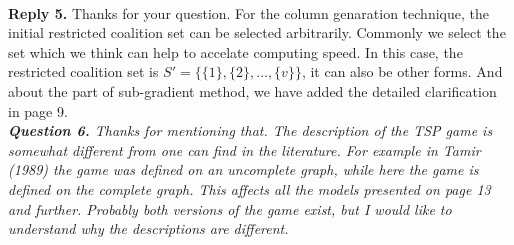 \documentclass[11pt]{article}
\begin{document}
\\[2mm]
\noindent \textbf{Reply 5.}
Thanks for your question. For the column genaration technique, the initial restricted coalition set can be selected arbitrarily. Commonly we select the set which we think can help to accelate computing speed. In this case, the restricted coalition set is
$S' = \{\{1\},\{2\},\ldots, \{v\}\}$, it can also be other forms.
And about the part of sub-gradient method, we have added the detailed clarification in page 9.
\\[4mm]
%
%
\noindent \textit{\textbf{Question 6.}
Thanks for mentioning that.
The description of the TSP game is somewhat different from one can find in the literature. For example in Tamir (1989) the game was defined on an uncomplete graph, while here the game is defined on the complete graph. This affects all the models presented on page 13 and further. Probably both versions of the game exist, but I would like to understand why the descriptions are different.}
\end{document}
